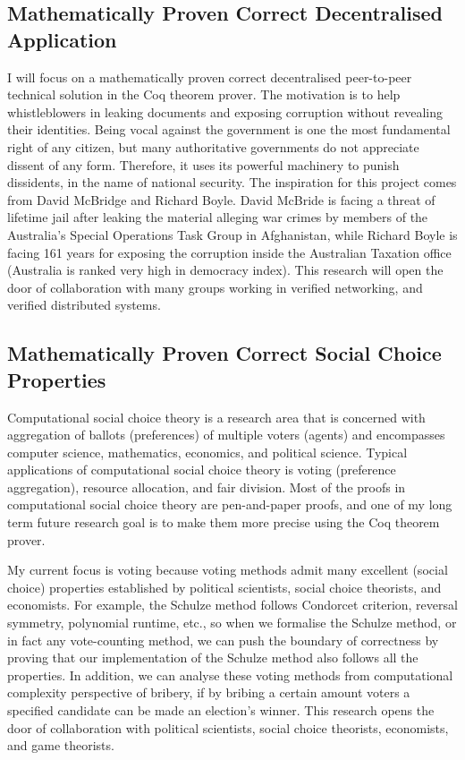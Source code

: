 \documentclass[11pt,a4paper,roman]{moderncv}
\begin{document}
\subsection{Mathematically Proven Correct Decentralised Application}
I will focus on a mathematically proven correct decentralised peer-to-peer technical solution 
 in the Coq theorem prover. The motivation 
is to help 
whistleblowers in leaking documents and exposing corruption without revealing their identities.
Being vocal against the government is one the most fundamental right of any citizen, but many 
authoritative governments do not appreciate dissent of any form. Therefore, it uses 
its powerful machinery to punish dissidents, in the name of national security. 
The inspiration for this project comes from David McBridge and 
Richard Boyle.
David McBride 
is facing a threat of lifetime jail after
leaking the material alleging war crimes by members of the Australia's Special Operations
Task Group in Afghanistan, while Richard Boyle is facing 161 years for exposing the corruption 
inside the Australian Taxation office
(Australia is ranked very high in 
democracy index). 
This research will open the door of collaboration with many groups working in verified 
networking, and verified distributed systems. 

\subsection{Mathematically Proven Correct Social Choice Properties}
Computational social choice theory is a research area that is concerned
with aggregation of ballots (preferences)  of multiple voters (agents) and encompasses 
computer science, mathematics, economics, and political science. Typical applications of 
computational social choice theory is voting (preference aggregation), resource allocation, and fair division.
Most of the proofs in computational social choice theory are pen-and-paper proofs, 
and one of my long term future research goal is to make them more precise using the Coq theorem prover.

My current focus is voting because voting methods admit many excellent (social choice) properties
established by political scientists, social choice theorists, 
and economists. For example, the Schulze method follows Condorcet criterion, reversal symmetry,
polynomial runtime, etc., so when we formalise the Schulze method, or in fact any vote-counting method, 
we can push the boundary of correctness by proving that our 
implementation of the Schulze method also follows all the properties. 
In addition, we can analyse these voting
methods from computational complexity perspective of bribery, if by bribing a certain amount 
voters a specified candidate can be made an election's winner. 
This research opens the door of collaboration with political scientists, 
social choice theorists, economists, and game theorists.
\end{document}
